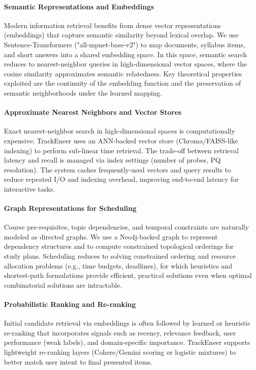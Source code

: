 \documentclass[12pt]{article}
\begin{document}
\paragraph{Semantic Representations and Embeddings}
Modern information retrieval benefits from dense vector representations (embeddings) that capture semantic similarity beyond lexical overlap. We use Sentence-Transformers ("all-mpnet-base-v2") to map documents, syllabus items, and short answers into a shared embedding space. In this space, semantic search reduces to nearest-neighbor queries in high-dimensional vector spaces, where the cosine similarity approximates semantic relatedness. Key theoretical properties exploited are the continuity of the embedding function and the preservation of semantic neighborhoods under the learned mapping.

\paragraph{Approximate Nearest Neighbors and Vector Stores}
Exact nearest-neighbor search in high-dimensional spaces is computationally expensive; TrackEneer uses an ANN-backed vector store (Chroma/FAISS-like indexing) to perform sub-linear time retrieval. The trade-off between retrieval latency and recall is managed via index settings (number of probes, PQ resolution). The system caches frequently-used vectors and query results to reduce repeated I/O and indexing overhead, improving end-to-end latency for interactive tasks.

\paragraph{Graph Representations for Scheduling}
Course pre-requisites, topic dependencies, and temporal constraints are naturally modeled as directed graphs. We use a Neo4j-backed graph to represent dependency structures and to compute constrained topological orderings for study plans. Scheduling reduces to solving constrained ordering and resource allocation problems (e.g., time budgets, deadlines), for which heuristics and shortest-path formulations provide efficient, practical solutions even when optimal combinatorial solutions are intractable.

\paragraph{Probabilistic Ranking and Re-ranking}
Initial candidate retrieval via embeddings is often followed by learned or heuristic re-ranking that incorporates signals such as recency, relevance feedback, user performance (weak labels), and domain-specific importance. TrackEneer supports lightweight re-ranking layers (Cohere/Gemini scoring or logistic mixtures) to better match user intent to final presented items.
\end{document}
